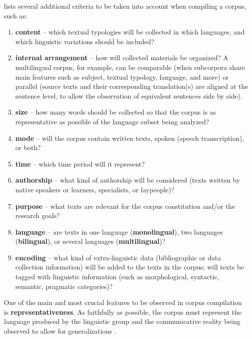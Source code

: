\documentclass[english]{textolivre}
\begin{document}
\textcite[p.~20]{sardinha_linguistica_2004} lists several additional criteria to be taken into account when compiling a corpus, such as:

\begin{enumerate}[label=\alph*)]
\item \textbf{content} – which textual typologies will be collected in which languages, and which linguistic variations should be included?
\item \textbf{internal arrangement} – how will collected materials be organized? A multilingual corpus, for example, can be comparable (when subcorpora share main features such as subject, textual typology, language, and more) or parallel (source texts and their corresponding translation(s) are aligned at the sentence level, to allow the observation of equivalent sentences side by side).
\item \textbf{size} – how many words should be collected so that the corpus is as representative as possible of the language subset being analyzed?
\item \textbf{mode} – will the corpus contain written texts, spoken (speech transcription), or both?
\item \textbf{time} – which time period will it represent?
\item \textbf{authorship} – what kind of authorship will be considered (texts written by native speakers or learners, specialists, or laypeople)?
\item \textbf{purpose} – what texts are relevant for the corpus constitution and/or the research goals?
\item \textbf{language} – are texts in one language (\textbf{monolingual}), two languages (\textbf{bilingual}), or several languages (\textbf{multilingual})?
\item \textbf{encoding} – what kind of extra-linguistic data (bibliographic or data collection information) will be added to the texts in the corpus; will texts be tagged with linguistic information (such as morphological, syntactic, semantic, pragmatic categories)?
\end{enumerate}

One of the main and most crucial features to be observed in corpus compilation is \textbf{representativeness}. As faithfully as possible, the corpus must represent the language produced by the linguistic group and the communicative reality being observed to allow for generalizations \cites[p.~22]{sardinha_linguistica_2004}[p.~164]{teixeira_linguistica_2008}{mcenery_corpus_2012}.
\end{document}
